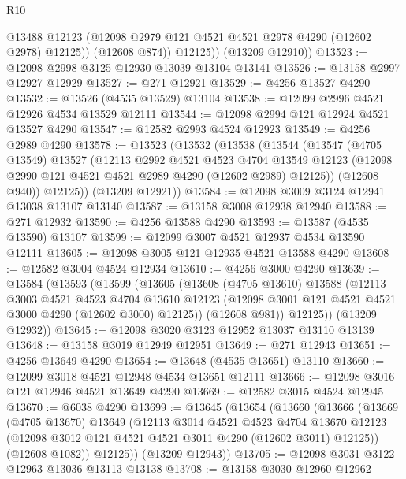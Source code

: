 \begin{lexlean}{R10}
\begin{coremodule}
              @13488
              @12123
              (@12098 @2979 @121 @4521 @4521 @2978 @4290 (@12602 @2978) @12125))
            (@12608 @874))
          @12125))
      (@13209 @12910))
@13523 := @12098 @2998 @3125 @12930 @13039 @13104 @13141
@13526 := @13158 @2997 @12927 @12929
@13527 := @271 @12921
@13529 := @4256 @13527 @4290
@13532 := @13526 (@4535 @13529) @13104
@13538 := @12099 @2996 @4521 @12926 @4534 @13529 @12111
@13544 := @12098 @2994 @121 @12924 @4521 @13527 @4290
@13547 := @12582 @2993 @4524 @12923
@13549 := @4256 @2989 @4290
@13578 := @13523
    (@13532
      (@13538
        (@13544
          (@13547
            (@4705 @13549)
            @13527
            (@12113
              @2992
              @4521
              @4523
              @4704
              @13549
              @12123
              (@12098 @2990 @121 @4521 @4521 @2989 @4290 (@12602 @2989) @12125))
            (@12608 @940))
          @12125))
      (@13209 @12921))
@13584 := @12098 @3009 @3124 @12941 @13038 @13107 @13140
@13587 := @13158 @3008 @12938 @12940
@13588 := @271 @12932
@13590 := @4256 @13588 @4290
@13593 := @13587 (@4535 @13590) @13107
@13599 := @12099 @3007 @4521 @12937 @4534 @13590 @12111
@13605 := @12098 @3005 @121 @12935 @4521 @13588 @4290
@13608 := @12582 @3004 @4524 @12934
@13610 := @4256 @3000 @4290
@13639 := @13584
    (@13593
      (@13599
        (@13605
          (@13608
            (@4705 @13610)
            @13588
            (@12113
              @3003
              @4521
              @4523
              @4704
              @13610
              @12123
              (@12098 @3001 @121 @4521 @4521 @3000 @4290 (@12602 @3000) @12125))
            (@12608 @981))
          @12125))
      (@13209 @12932))
@13645 := @12098 @3020 @3123 @12952 @13037 @13110 @13139
@13648 := @13158 @3019 @12949 @12951
@13649 := @271 @12943
@13651 := @4256 @13649 @4290
@13654 := @13648 (@4535 @13651) @13110
@13660 := @12099 @3018 @4521 @12948 @4534 @13651 @12111
@13666 := @12098 @3016 @121 @12946 @4521 @13649 @4290
@13669 := @12582 @3015 @4524 @12945
@13670 := @6038 @4290
@13699 := @13645
    (@13654
      (@13660
        (@13666
          (@13669
            (@4705 @13670)
            @13649
            (@12113
              @3014
              @4521
              @4523
              @4704
              @13670
              @12123
              (@12098 @3012 @121 @4521 @4521 @3011 @4290 (@12602 @3011) @12125))
            (@12608 @1082))
          @12125))
      (@13209 @12943))
@13705 := @12098 @3031 @3122 @12963 @13036 @13113 @13138
@13708 := @13158 @3030 @12960 @12962

\end{coremodule}
\end{lexlean}

